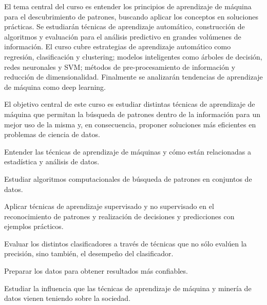 \begin{syllabus}


\begin{justification}

El tema central del curso es entender los principios de aprendizaje de máquina para el descubrimiento de patrones, buscando aplicar los conceptos en soluciones prácticas. Se estudiarán técnicas de aprendizaje automático, construcción de algoritmos y evaluación para el análisis predictivo en grandes volúmenes de información. El curso cubre estrategias de aprendizaje automático como regresión, clasificación y clustering; modelos inteligentes como árboles de decisión, redes neuronales y SVM; métodos de pre-procesamiento de información y reducción de dimensionalidad. Finalmente se analizarán tendencias de aprendizaje de máquina como deep learning.
\end{justification}

\begin{goals}

El objetivo central de este curso es estudiar distintas técnicas de aprendizaje de máquina que permitan la búsqueda de patrones dentro de la información para un mejor uso de la misma y, en consecuencia, proponer soluciones más eficientes en problemas de ciencia de datos.

\item Entender las técnicas de aprendizaje de máquinas y cómo están relacionadas a estadística y análisis de datos.

 Estudiar algoritmos computacionales de búsqueda de patrones en conjuntos de datos.

 Aplicar técnicas de aprendizaje supervisado y no supervisado en el reconocimiento de patrones y realización de decisiones y predicciones con ejemplos prácticos.

 Evaluar los distintos clasificadores a través de técnicas que no sólo evalúen la precisión, sino también, el desempeño del clasificador.

\item Preparar los datos para obtener resultados más confiables.

\item Estudiar la influencia que las técnicas de aprendizaje de máquina y minería de datos vienen teniendo sobre la sociedad.
\end{goals}

\begin{outcomes}
\item {}
\item {}
\end{outcomes}


\end{syllabus}
